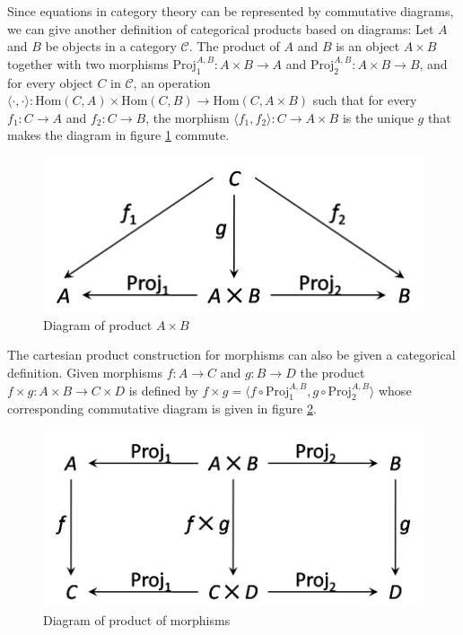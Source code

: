 Since equations in category theory can be represented by commutative diagrams, we can give another definition of categorical products based on diagrams: Let $ A $ and $ B $ be objects in a category $ \mathcal{C} $. The product of $ A $ and $ B $ is an object $ A \times B $ together with two morphisms $ \text{Proj}_1^{A,B}: A \times B \to A $ and $ \text{Proj}_2^{A,B}: A \times B \to B $, and for every object $ C $ in $ \mathcal{C} $, an operation $ \langle \cdot , \cdot \rangle : \text{Hom}(C,A) \times \text{Hom}(C,B) \to \text{Hom}(C, A \times B) $ such that for every $ f_1 : C \to A $ and $ f_2 : C \to B $, the morphism $ \langle f_1 , f_2 \rangle : C \to A \times B $ is the unique $ g $ that makes the diagram in figure \ref{figure:cat_prod} commute.
\begin{figure}[h!]
\centering
\includegraphics[scale=0.42]{./images/cat_prod}
\caption{Diagram of product $ A \times B $}
\label{figure:cat_prod}
\end{figure}

The cartesian product construction for morphisms can also be given a categorical definition. Given morphisms $ f : A \to C $ and $ g : B \to D $ the product $ f \times g : A \times B \to C \times D $ is defined by $ f \times g = \langle f \circ \text{Proj}_1^{A,B} , g \circ \text{Proj}_2^{A,B} \rangle $ whose corresponding commutative diagram is given in figure \ref{figure:cat_prod_mor}.
\begin{figure}[h!]
\centering
\includegraphics[scale=0.42]{./images/cat_prod_mor}
\caption{Diagram of product of morphisms}
\label{figure:cat_prod_mor}
\end{figure}

